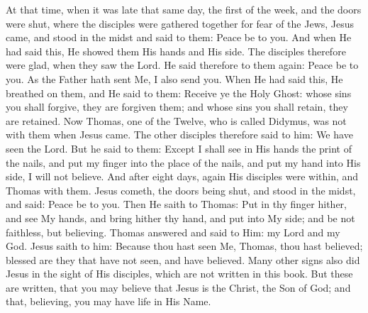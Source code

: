 {{At that time, when it was late that same day, the first of the week, and the doors were shut, where the disciples were gathered together for fear of the Jews, Jesus came, and stood in the midst and said to them: Peace be to you. And when He had said this, He showed them His hands and His side. The disciples therefore were glad, when they saw the Lord. He said therefore to them again: Peace be to you. As the Father hath sent Me, I also send you. When He had said this, He breathed on them, and He said to them: Receive ye the Holy Ghost: whose sins you shall forgive, they are forgiven them; and whose sins you shall retain, they are retained. Now Thomas, one of the Twelve, who is called Didymus, was not with them when Jesus came. The other disciples therefore said to him: We have seen the Lord. But he said to them: Except I shall see in His hands the print of the nails, and put my finger into the place of the nails, and put my hand into His side, I will not believe. And after eight days, again His disciples were within, and Thomas with them. Jesus cometh, the doors being shut, and stood in the midst, and said: Peace be to you. Then He saith to Thomas: Put in thy finger hither, and see My hands, and bring hither thy hand, and put into My side; and be not faithless, but believing. Thomas answered and said to Him: my Lord and my God. Jesus saith to him: Because thou hast seen Me, Thomas, thou hast believed; blessed are they that have not seen, and have believed. Many other signs also did Jesus in the sight of His disciples, which are not written in this book. But these are written, that you may believe that Jesus is the Christ, the Son of God; and that, believing, you may have life in His Name.
  }
}
\newcommand{\offertory}{%
Angelus Dómini descéndit de cœlo, et dixit muliéribus: Quem quǽritis, surréxit, sicut dixit, allelúia.
}
\newcommand{\offertoryTranslation}{%
An Angel of the Lord descended from heaven, and said to the women; He whom you seek is risen, as He said. Alleluia.
}
\newcommand{\secret}{%
  \l{%
Súscipe múnera, Dómine, quǽsumus, exsultántis Ecclésiæ: et, cui causam tanti gáudii præstitísti, perpétuæ fructum concéde lætítiæ.
  }
  \e{%
Receive, we beseech Thee, O Lord, the gifts of Thine exultant Church: and to her whom Thou hast given cause for so great joy, grant the fruit of perpetual happiness.
  }
  \perDominum
}
\newcommand{\communion}{%
Mitte manum tuam, et cognósce loca clavórum, allelúia: et noli esse incrédulus, sed fidélis, allelúia, allelúia.
}
\newcommand{\communionTranslation}{%
Put in thy hand, and know the place of the nails, alleluia; and be not faithless, but believing, alleluia, alleluia.
}
\newcommand{\postcommunion}{%
  \l{%
Quǽsumus, Dómine, Deus noster: ut sacrosáncta mystéria, quæ pro reparatiónis nostræ munímine contulísti; et præsens nobis remédium esse fácias et futúrum.
  }
  \e{%
We beseech Thee, O Lord, our God, to make the most holy Mysteries which Thou hast given us as a defense of our renewal, a remedy for us now, and in the future.
  }
  \perDominum
}

